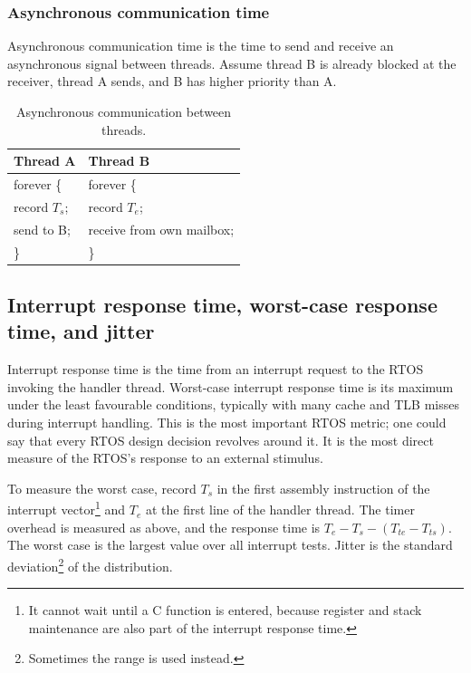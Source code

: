 \subsubsection{Asynchronous communication time}

Asynchronous communication time is the time to send and receive an asynchronous signal between threads.
Assume thread B is already blocked at the receiver, thread A sends, and B has higher priority than A.

\begin{table}[htbp]
    \centering
    \caption{Asynchronous communication between threads.}
    \small
    \begin{tabular}{@{}p{}p{}@{}}
        \toprule
        Thread A & Thread B\\
        \midrule
        forever \{ & forever \{ \\ \quad record \(T_s\); & \quad record \(T_e\); \\ \quad send to B; & \quad receive from own mailbox; \\ \} & \}\\
        \bottomrule
    \end{tabular}
\end{table}

\subsection{Interrupt response time, worst-case response time, and jitter}

Interrupt response time is the time from an interrupt request to the RTOS invoking the handler thread.
Worst-case interrupt response time is its maximum under the least favourable conditions, typically with many cache and TLB misses during interrupt handling.
This is the most important RTOS metric; one could say that every RTOS design decision revolves around it.
It is the most direct measure of the RTOS's response to an external stimulus.

To measure the worst case, record \(T_s\) in the first assembly instruction of the interrupt vector\footnote{It cannot wait until a C function is entered, because register and stack maintenance are also part of the interrupt response time.} and \(T_e\) at the first line of the handler thread.
The timer overhead is measured as above, and the response time is \(T_e-T_s-(T_{te}-T_{ts})\).
The worst case is the largest value over all interrupt tests.
Jitter is the standard deviation\footnote{Sometimes the range is used instead.} of the distribution.

